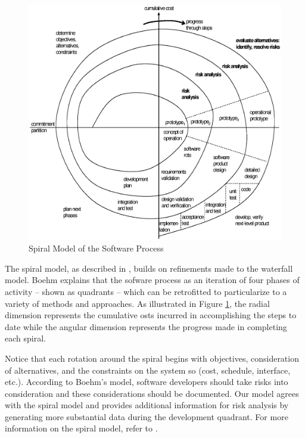 \begin{figure}[t]
\begin{center}
\includegraphics[scale=0.66]{images/spiral.eps}
\end{center}
\caption{Spiral Model of the Software Process}
\label{fig:spiral}
\end{figure}

The spiral model, as described in \cite{Boehm1986}, builds on refinements made
to the waterfall model. Boehm explains that the sofware process as an iteration
of four phases of activity -- shown as quadrants -- which can be retrofitted to
particularize to a variety of methods and approaches. As illustrated in Figure
\ref{fig:spiral}, the radial dimension represents the cumulative osts incurred
in accomplishing the steps to date while the angular dimension represents the
progress made in completing each spiral.

Notice that each rotation around the spiral begins with objectives,
consideration of alternatives, and the constraints on the system so (cost,
schedule, interface, etc.). According to Boehm's model, software developers
should take risks into consideration and these considerations should be
documented. Our model agrees with the spiral model and provides additional
information for risk analysis by generating more substantial data during the
development quadrant. For more information on the spiral model, refer to
\cite{Boehm1986}.
